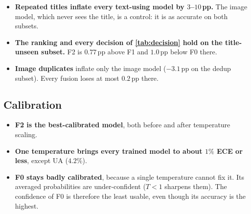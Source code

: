 \begin{itemize}
  \item \textbf{Repeated titles inflate every text-using model by $3$--$10$\,pp.} The image model, which never sees
        the title, is a control: it is as accurate on both subsets.
  \item \textbf{The ranking and every decision of \cref{tab:decision} hold on the title-unseen subset.} F2 is
        $0.77$\,pp above F1 and $1.0$\,pp below F0 there.
  \item \textbf{Image duplicates} inflate only the image model ($-3.1$\,pp on the dedup subset). Every fusion
        loses at most $0.2$\,pp there.
\end{itemize}

\subsection{Calibration}
\label{sec:calibration}

\begin{table}[H]
  \centering\small
  \caption{Test ECE (\%) before and after temperature scaling; $T$ is fitted on validation.}
  \label{tab:calibration}
\end{table}

\begin{itemize}
  \item \textbf{F2 is the best-calibrated model}, both before and after temperature scaling.
  \item \textbf{One temperature brings every trained model to about $1\%$ ECE or less}, except UA ($4.2\%$).
  \item \textbf{F0 stays badly calibrated}, because a single temperature cannot fix it. Its averaged probabilities
        are under-confident ($T<1$ sharpens them). The confidence of F0 is therefore the least usable, even
        though its accuracy is the highest.
\end{itemize}

